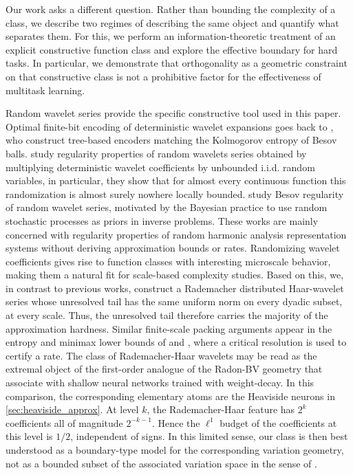 \documentclass[twoside,11pt]{article}
\begin{document}
Our work asks a different question. Rather than bounding the complexity of a class, we describe two regimes of describing the same object and quantify what separates them. For this, we perform an information-theoretic treatment of an explicit constructive function class and explore the effective boundary for hard tasks. In particular, we demonstrate that orthogonality as a geometric constraint on that constructive class is not a prohibitive factor for the effectiveness of multitask learning.

Random wavelet series provide the specific constructive tool used in this paper. Optimal finite-bit encoding of deterministic wavelet expansions goes back to \cite{Cohen01TreeApproximationOptimal}, who construct tree-based encoders matching the Kolmogorov entropy of Besov balls. \cite{Esser24RegularityPropertiesRandom} study regularity properties of random wavelets series obtained by multiplying deterministic wavelet coefficients by unbounded i.i.d. random variables, in particular, they show that for almost every continuous function this randomization is almost surely nowhere locally bounded. \cite{Horst24BesovRegularityRandom} study Besov regularity of random wavelet series, motivated by the Bayesian practice to use random stochastic processes as priors in inverse problems. These works are mainly concerned with regularity properties of random harmonic analysis representation systems without deriving approximation bounds or rates. Randomizing wavelet coefficients gives rise to function classes with interesting microscale behavior, making them a natural fit for scale-based complexity studies. Based on this, we, in contrast to previous works, construct a Rademacher distributed Haar-wavelet series whose unresolved tail has the same uniform norm on every dyadic subset, at every scale. Thus, the unresolved tail therefore carries the majority of the approximation hardness. Similar finite-scale packing arguments appear in the entropy and minimax lower bounds of \cite{Parhi23NearMinimaxOptimalEstimation} and \cite{Siegel24SharpBoundsApproximation}, where a critical resolution is used to certify a rate. The class of Rademacher-Haar wavelets may be read as the extremal object of the first-order analogue of the Radon-BV geometry that \cite{Parhi21BanachSpaceRepresenter} associate with shallow neural networks trained with weight-decay. In this comparison, the corresponding elementary atoms are the Heaviside neurons in \cref{sec:heaviside_approx}. At level $k$, the Rademacher-Haar feature has $2^k$ coefficients all of magnitude $2^{-k-1}$. Hence the $\ell^1$ budget of the coefficients at this level is $1/2$, independent of signs. In this limited sense, our class is then best understood as a boundary-type model for the corresponding variation geometry, not as a bounded subset of the associated variation space in the sense of \cite{Siegel23CharacterizationVariationSpaces}.
\end{document}
